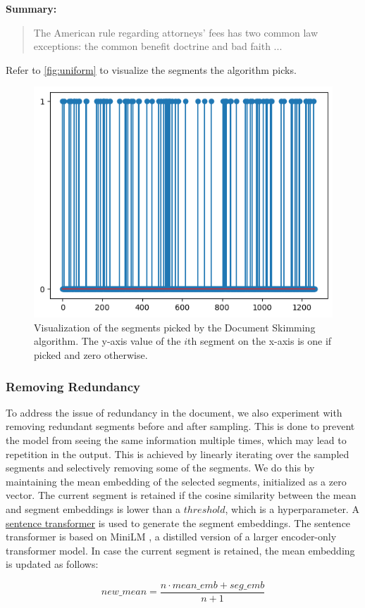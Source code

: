 \noindent \textbf{Summary:}
\begin{quote}
  The American rule regarding attorneys' fees has two common law exceptions: the common benefit doctrine and bad faith ...
\end{quote}

Refer to \autoref{fig:uniform} to visualize the segments the algorithm picks.

\begin{figure}
  \centering
  \includegraphics*[width=.45\textwidth]{images/uniform.png}
  \caption{
    Visualization of the segments picked by the Document Skimming algorithm.
    The y-axis value of the $i$th segment on the x-axis is one if picked and zero otherwise.
  }
  \label{fig:uniform}
\end{figure}

\subsubsection*{Removing Redundancy}

To address the issue of redundancy in the document, we also experiment with removing redundant segments before and after sampling.
This is done to prevent the model from seeing the same information multiple times, which may lead to repetition in the output.
This is achieved by linearly iterating over the sampled segments and selectively removing some of the segments.
We do this by maintaining the mean embedding of the selected segments, initialized as a zero vector.
The current segment is retained if the cosine similarity between the mean and segment embeddings is lower than a $threshold$, which is a hyperparameter.
A \href{https://huggingface.co/sentence-transformers/all-MiniLM-L6-v2}{sentence transformer} is used to generate the segment embeddings.
The sentence transformer is based on MiniLM \cite{wang2020minilm}, a distilled version of a larger encoder-only transformer model.
In case the current segment is retained, the mean embedding is updated as follows:

\[ new\_mean = \frac{n \cdot mean\_emb + seg\_emb}{n + 1} \]

